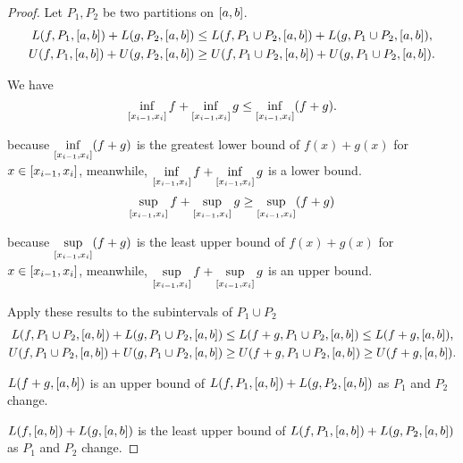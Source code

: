 \begin{proof}
    Let $P_{1}, P_{2}$ be two partitions on $\left[{a, b}\right]$.
    \begin{align*}
        L(f, P_{1}, \left[{a, b}\right]) + L(g, P_{2}, \left[{a, b}\right]) & \leq L(f, P_{1}\cup P_{2}, \left[{a, b}\right]) + L(g, P_{1}\cup P_{2}, \left[{a, b}\right]), \\
        U(f, P_{1}, \left[{a, b}\right]) + U(g, P_{2}, \left[{a, b}\right]) & \geq U(f, P_{1}\cup P_{2}, \left[{a, b}\right]) + U(g, P_{1}\cup P_{2}, \left[{a, b}\right]).
    \end{align*}

    We have
    \[
        \inf\limits_{\left[{x_{i-1}, x_{i}}\right]}f + \inf\limits_{\left[{x_{i-1}, x_{i}}\right]}g \leq \inf\limits_{\left[{x_{i-1}, x_{i}}\right]}(f + g).
    \]

    because $\inf\limits_{\left[{x_{i-1}, x_{i}}\right]}(f + g)$ is the greatest lower bound of $f(x) + g(x)$ for $x\in\left[{x_{i-1}, x_{i}}\right]$, meanwhile, $\inf\limits_{\left[{x_{i-1}, x_{i}}\right]}f + \inf\limits_{\left[{x_{i-1}, x_{i}}\right]}g$ is a lower bound.
    \[
        \sup\limits_{\left[{x_{i-1}, x_{i}}\right]}f + \sup\limits_{\left[{x_{i-1}, x_{i}}\right]}g \geq \sup\limits_{\left[{x_{i-1}, x_{i}}\right]}(f + g)
    \]

    because $\sup\limits_{\left[{x_{i-1}, x_{i}}\right]}(f + g)$ is the least upper bound of $f(x) + g(x)$ for $x\in\left[{x_{i-1}, x_{i}}\right]$, meanwhile, $\sup\limits_{\left[{x_{i-1}, x_{i}}\right]}f + \sup\limits_{\left[{x_{i-1}, x_{i}}\right]}g$ is an upper bound.

    Apply these results to the subintervals of $P_{1}\cup P_{2}$
    \begin{align*}
        L(f, P_{1}\cup P_{2}, \left[{a, b}\right]) + L(g, P_{1}\cup P_{2}, \left[{a, b}\right]) & \leq L(f + g, P_{1}\cup P_{2}, \left[{a, b}\right]) \leq L(f + g, \left[{a, b}\right]), \\
        U(f, P_{1}\cup P_{2}, \left[{a, b}\right]) + U(g, P_{1}\cup P_{2}, \left[{a, b}\right]) & \geq U(f + g, P_{1}\cup P_{2}, \left[{a, b}\right]) \geq U(f + g, \left[{a, b}\right]).
    \end{align*}

    $L(f + g, \left[{a, b}\right])$ is an upper bound of $L(f, P_{1}, \left[{a, b}\right]) + L(g, P_{2}, \left[{a, b}\right])$ as $P_{1}$ and $P_{2}$ change.

    $L(f, \left[{a, b}\right]) + L(g, \left[{a, b}\right])$ is the least upper bound of $L(f, P_{1}, \left[{a, b}\right]) + L(g, P_{2}, \left[{a, b}\right])$ as $P_{1}$ and $P_{2}$ change.


\end{proof}
